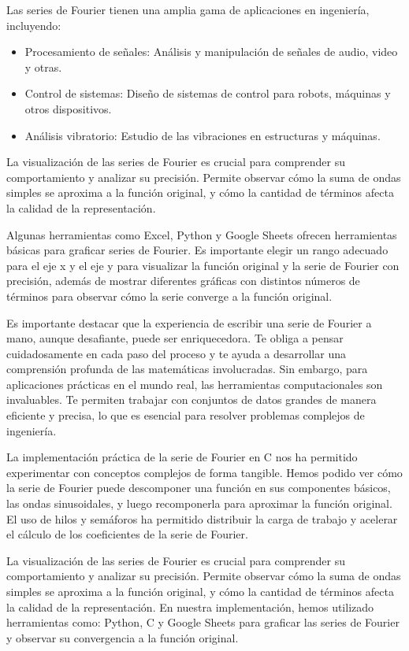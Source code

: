 Las series de Fourier tienen una amplia gama de aplicaciones en ingeniería, incluyendo:

\begin{itemize}
	\item Procesamiento de señales: Análisis y manipulación de señales de audio, video y otras.
	\item Control de sistemas: Diseño de sistemas de control para robots, máquinas y otros dispositivos.
	\item Análisis vibratorio: Estudio de las vibraciones en estructuras y máquinas.
\end{itemize}

La visualización de las series de Fourier es crucial para comprender su comportamiento y analizar su precisión. Permite observar cómo la suma de ondas simples se aproxima a la función original, y cómo la cantidad de términos afecta la calidad de la representación.

Algunas herramientas como Excel, Python y Google Sheets ofrecen herramientas básicas para graficar series de Fourier. Es importante elegir un rango adecuado para el eje x y el eje y para visualizar la función original y la serie de Fourier con precisión, además de mostrar diferentes gráficas con distintos números de términos para observar cómo la serie converge a la función original.

Es importante destacar que la experiencia de escribir una serie de Fourier a mano, aunque desafiante, puede ser enriquecedora. Te obliga a pensar cuidadosamente en cada paso del proceso y te ayuda a desarrollar una comprensión profunda de las matemáticas involucradas. Sin embargo, para aplicaciones prácticas en el mundo real, las herramientas computacionales son invaluables. Te permiten trabajar con conjuntos de datos grandes de manera eficiente y precisa, lo que es esencial para resolver problemas complejos de ingeniería.

La implementación práctica de la serie de Fourier en C nos ha permitido experimentar con conceptos complejos de forma tangible. Hemos podido ver cómo la serie de Fourier puede descomponer una función en sus componentes básicos, las ondas sinusoidales, y luego recomponerla para aproximar la función original. El uso de hilos y semáforos ha permitido distribuir la carga de trabajo y acelerar el cálculo de los coeficientes de la serie de Fourier.

La visualización de las series de Fourier es crucial para comprender su comportamiento y analizar su precisión. Permite observar cómo la suma de ondas simples se aproxima a la función original, y cómo la cantidad de términos afecta la calidad de la representación. En nuestra implementación, hemos utilizado herramientas como: Python, C y Google Sheets para graficar las series de Fourier y observar su convergencia a la función original.

